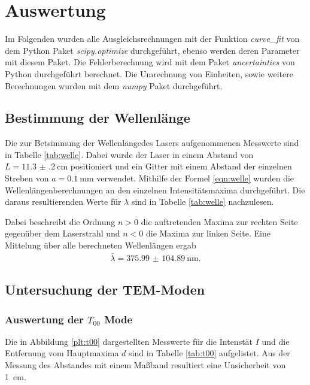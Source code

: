 \newpage
\section{Auswertung}

\label{sec:Auswertung}
Im Folgenden wurden alle Ausgleichsrechnungen mit der Funktion \textit{curve_fit} von dem
Python Paket \textit{scipy.optimize} \cite{scipy} durchgeführt, ebenso werden deren
Parameter mit diesem Paket. Die Fehlerberechnung wird mit dem Paket \textit{uncertainties}
\cite{uncertainties} von Python durchgeführt berechnet. Die Umrechnung von
Einheiten, sowie weitere Berechnungen wurden mit dem \textit{numpy} Paket \cite{numpy}
durchgeführt.

\subsection{Bestimmung der Wellenlänge}
Die zur Betsimmung der Wellenlängedes Lasers aufgenommenen Messwerte
sind in Tabelle \ref{tab:welle}. Dabei wurde der Laser in einem Abstand
von $L = \SI{11.3(2)}{\centi\meter}$ positioniert und ein Gitter mit einem
Abstand der einzelnen Streben von $a = \SI{0.1}{\milli\meter}$ verwendet.
Mithilfe der Formel \ref{eqn:welle} wurden die Wellenlängenberechnungen an den
einzelnen Intensitätsmaxima durchgeführt. Die daraus resultierenden Werte für
$\lambda$ sind in Tabelle \ref{tab:welle} nachzulesen.



Dabei beschreibt die Ordnung $n>0$ die auftretenden Maxima zur rechten Seite
gegenüber dem Laserstrahl und $n<0$ die Maxima zur linken Seite.
Eine Mittelung über alle berechneten Wellenlängen ergab
\begin{align*}
  \bar{\lambda} = \SI{375.99(10489)}{\nano\meter}.
\end{align*}


\subsection{Untersuchung der TEM-Moden}

\subsubsection{Auswertung der $T_{00}$ Mode}
Die in Abbildung \ref{plt:t00} dargestellten Messwerte für die Intenstät $I$
und die Entfernung vom Hauptmaxima $d$ sind in Tabelle \ref{tab:t00}
aufgelistet. Aus der Messung des Abstandes mit einem Maßband resultiert eine
Unsicherheit von \SI{1}{\centi\meter}.


